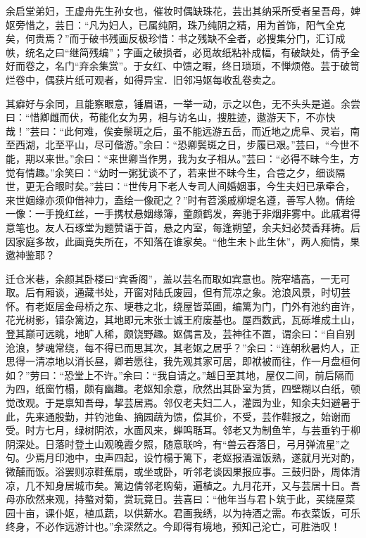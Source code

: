 \documentclass[]{article}
\begin{document}
余启堂弟妇，王虚舟先生孙女也，催妆时偶缺珠花，芸出其纳采所受者呈吾母，婢妪旁惜之，芸日：``凡为妇人，已属纯阴，珠乃纯阴之精，用为首饰，阳气全克矣，何贵焉？''而于破书残画反极珍惜：书之残缺不全者，必搜集分门，汇订成帙，统名之曰``继简残编''；字画之破损者，必觅故纸粘补成幅，有破缺处，倩予全好而卷之，名门``弃余集赏''。于女红、中馈之暇，终日琐琐，不惮烦倦。芸于破笥烂卷中，偶获片纸可观者，如得异宝．旧邻冯妪每收乱卷卖之。

其癖好与余同，且能察眼意，锤眉语，一举一动，示之以色，无不头头是道。余尝曰：``惜卿雌而伏，苟能化女为男，相与访名山，搜胜迹，遨游天下，不亦快哉！''芸曰：``此何难，俟妾鬃斑之后，虽不能远游五岳，而近地之虎阜、灵岩，南至西湖，北至平山，尽可偕游。''余曰：``恐卿鬓斑之日，步履已艰。''芸曰，``今世不能，期以来世。''余曰：``来世卿当作男，我为女子相从。''芸曰：``必得不昧今生，方觉有情趣。''余笑曰：``幼时一粥犹谈不了，若来世不昧今生，合卺之夕，细谈隔世，更无合眼时矣。''芸曰：``世传月下老人专司人间婚姻事，今生夫妇已承牵合，来世姻缘亦须仰借神力，盍绘一像祀之？''时有苕溪戚柳堤名遵，善写人物。倩绘一像：一手挽红丝，一手携杖悬姻缘簿，童颜鹤发，奔驰于非烟非雾中。此戚君得意笔也。友人石琢堂为题赞语于首，悬之内室，每逢朔望，余夫妇必焚香拜祷。后因家庭多故，此画竟失所在，不知落在谁家矣。``他生未卜此生休''，两人痴情，果邀神鉴耶？

迁仓米巷，余颜其卧楼曰``宾香阁''，盖以芸名而取如宾意也。院窄墙高，一无可取。后有厢谈，通藏书处，开窗对陆氏废园，但有荒凉之象。沧浪风景，时切芸怀。有老妪居金母桥之东、埂巷之北，绕屋皆菜圃，编篱为门，门外有池约亩许，花光树影，错杂篱边，其地即元末张士诚王府废基也。屋西数武，瓦砾堆成土山，登其巅可远眺，地旷人稀，颇饶野趣。妪偶言及，芸神往不置，谓余曰：``自自别沧浪，梦魂常绕，每不得已而思其次，其老妪之居乎？''余曰：``连朝秋暑灼人，正思得一清凉地以消长昼，卿若愿往，我先观其家可居，即袱被而往，作一月盘桓何如？''劳曰：``恐堂上不许。''余曰：``我自请之。''越日至其地，屋仅二间，前后隔而为四，纸窗竹榻，颇有幽趣。老妪知余意，欣然出其卧室为赁，四壁糊以白纸，顿觉改观。于是禀知吾母，挈芸居焉。邻仅老夫妇二人，灌园为业，知余夫妇避暑于此，先来通殷勤，并钓池鱼、摘园蔬为馈，偿其价，不受，芸作鞋报之，始谢而受。时方七月，绿树阴浓，水面风来，蝉鸣聒耳。邻老又为制鱼竿，与芸垂钓于柳阴深处。日落时登土山观晚霞夕照，随意联吟，有``兽云吞落日，弓月弹流星''之句。少焉月印池中，虫声四起，设竹榻于篱下，老妪报酒温饭熟，遂就月光对酌，微醺而饭。浴罢则凉鞋蕉扇，或坐或卧，听邻老谈因果报应事。三鼓归卧，周体清凉，几不知身居城市矣。篱边倩邻老购菊，遍植之。九月花开，又与芸居十日。吾母亦欣然来观，持螯对菊，赏玩竟日。芸喜曰：``他年当与君卜筑于此，买绕屋菜园十亩，课仆妪，植瓜蔬，以供薪水。君画我绣，以为持酒之需。布衣菜饭，可乐终身，不必作远游计也。''余深然之。今即得有境地，预知己沦亡，可胜浩叹！
\end{document}
